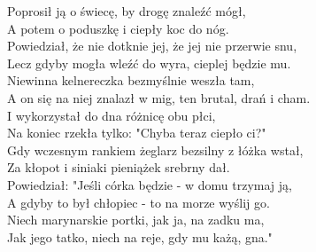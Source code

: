 Poprosił ją o świecę, by drogę znaleźć mógł, \\
A potem o poduszkę i ciepły koc do nóg. \\
Powiedział, że nie dotknie jej, że jej nie przerwie snu, \\
Lecz gdyby mogła wleźć do wyra, cieplej będzie mu. \\

Niewinna kelnereczka bezmyślnie weszła tam, \\
A on się na niej znalazł w mig, ten brutal, drań i cham. \\
I wykorzystał do dna różnicę obu płci, \\
Na koniec rzekła tylko: "Chyba teraz ciepło ci?" \\

Gdy wczesnym rankiem żeglarz bezsilny z łóżka wstał, \\
Za kłopot i siniaki pieniążek srebrny dał. \\
Powiedział: "Jeśli córka będzie - w domu trzymaj ją, \\
A gdyby to był chłopiec - to na morze wyślij go. \\

Niech marynarskie portki, jak ja, na zadku ma, \\
Jak jego tatko, niech na reje, gdy mu każą, gna." \\